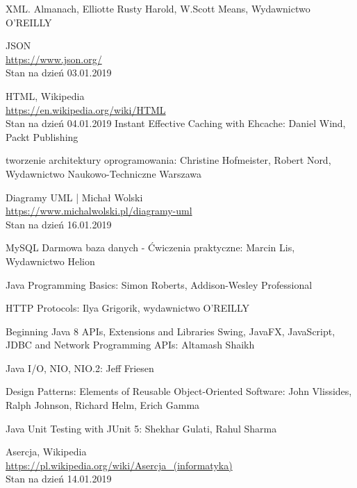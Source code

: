 \documentclass[12pt, twoside]{report}
\begin{document}
\begin{thebibliography}{9}
XML. Almanach, Elliotte Rusty Harold, W.Scott Means, Wydawnictwo O'REILLY

  JSON \\
  \url{https://www.json.org/} \\
  Stan na dzień 03.01.2019

    HTML, Wikipedia \\
	\url{https://en.wikipedia.org/wiki/HTML} \\
	Stan na dzień 04.01.2019
Instant Effective Caching with Ehcache: Daniel Wind, Packt Publishing


tworzenie architektury oprogramowania: Christine Hofmeister, Robert Nord, Wydawnictwo Naukowo-Techniczne Warszawa

	Diagramy UML | Michał Wolski\\ \url{https://www.michalwolski.pl/diagramy-uml} \\
	Stan na dzień 16.01.2019
	
MySQL Darmowa baza danych - Ćwiczenia praktyczne: Marcin Lis, Wydawnictwo Helion

Java Programming Basics: Simon Roberts, Addison-Wesley Professional

HTTP Protocols: Ilya Grigorik, wydawnictwo O'REILLY

Beginning Java 8 APIs, Extensions and Libraries Swing, JavaFX, JavaScript, JDBC and Network Programming APIs: Altamash Shaikh

Java I/O, NIO, NIO.2: Jeff Friesen

Design Patterns: Elements of Reusable Object-Oriented Software: John Vlissides, Ralph Johnson, Richard Helm, Erich Gamma

Java Unit Testing with JUnit 5: Shekhar Gulati, Rahul Sharma

Asercja, Wikipedia \\
\url{https://pl.wikipedia.org/wiki/Asercja_(informatyka)} \\
Stan na dzień 14.01.2019

\end{thebibliography}
\end{document}
